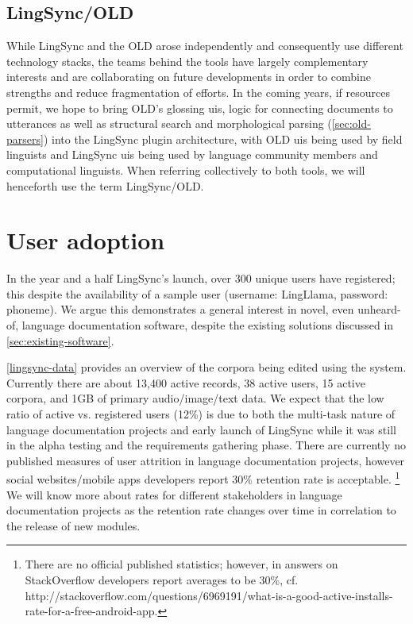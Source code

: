 \documentclass[11pt]{article}
\begin{document}
\subsection{LingSync/OLD}

While LingSync and the OLD arose independently and consequently use different
technology stacks, the teams behind the tools have largely complementary
interests and are collaborating on future developments in order to combine
strengths and reduce fragmentation of efforts. In the coming years, if resources
permit, we hope to bring OLD's glossing \glspl{ui}, logic for connecting
documents to utterances as well as structural search and morphological parsing
(\autoref{sec:old-parsers}) into the LingSync plugin architecture, with OLD
\glspl{ui} being used by field linguists and LingSync \glspl{ui} being used by
language community members and computational linguists. When referring
collectively to both tools, we will henceforth use the term LingSync/OLD.


\section{User adoption}

In the year and a half LingSync's launch, over 300 unique users have
registered; this despite the availability of a sample user (username:
LingLlama, password: phoneme). We argue this demonstrates a general interest in
novel, even unheard-of, language documentation software, despite the existing
solutions discussed in \autoref{sec:existing-software}.

\autoref{lingsync-data} provides an overview of the corpora being edited using
the system. Currently there are about 13,400 active records, 38 active users,
15 active corpora, and 1GB of primary audio/image/text data. We expect that the
low ratio of active vs. registered users (12\%) is due to both the multi-task
nature of language documentation projects and early launch of LingSync while it
was still in the alpha testing and the requirements gathering phase.  There are currently no published measures of user
attrition in language documentation projects, however social websites/mobile
apps  developers report 30\% retention rate is acceptable.%
\footnote{There are no official published statistics; however, in answers on
    StackOverflow developers report averages to be 30\%, cf.
http://stackoverflow.com/questions/6969191/what-is-a-good-active-installs-rate-for-a-free-android-app.}
We will
know more about rates for different stakeholders in language documentation projects as the retention rate changes over time  in correlation to the
release of new modules.
\end{document}

